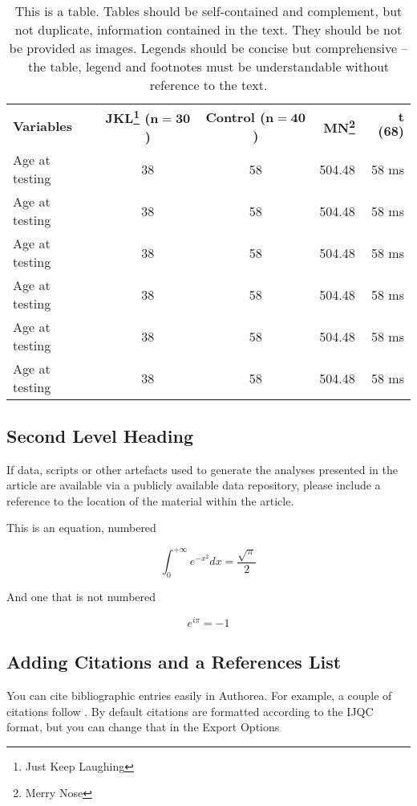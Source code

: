\documentclass[num-refs]{wiley-article}
\begin{document}
\begin{table}
\caption{{This is a table. Tables should be self-contained and complement, but not duplicate, information contained in the text. They should be not be provided as images. Legends should be concise but comprehensive -- the table, legend and footnotes must be understandable without reference to the text.}}
\begin{tabular}{lccrr}
\hline
\textbf{Variables} & \textbf{JKL\footnote{Just Keep Laughing} ($\boldsymbol{n=30}$)} & \textbf{Control ($\boldsymbol{n=40}$)} & \textbf{MN\footnote{Merry Nose}} & \textbf{$\boldsymbol t$ (68)}\\
Age at testing & 38 & 58 & 504.48 & 58 ms\\
Age at testing & 38 & 58 & 504.48 & 58 ms\\
Age at testing & 38 & 58 & 504.48 & 58 ms\\
Age at testing & 38 & 58 & 504.48 & 58 ms\\
Age at testing & 38 & 58 & 504.48 & 58 ms\\
Age at testing & 38 & 58 & 504.48 & 58 ms\\
\hline  
\end{tabular}
\end{table}


\subsection{Second Level Heading}
If data, scripts or other artefacts used to generate the analyses presented in the article are available via a publicly available data repository, please include a reference to the location of the material within the article.

This is an equation, numbered

\begin{equation}
\label{eqn:some}
\int_0^{+\infty}e^{-x^2}dx=\frac{\sqrt{\pi}}{2}
\end{equation}

And one that is not numbered

\begin{equation*}
e^{i\pi}=-1
\end{equation*}

\subsection{Adding Citations and a References List}

You can cite bibliographic entries easily in Authorea. For example, a couple of citations follow \cite{Cavalleri_2016}. By default citations are formatted according to the IJQC format, but you can change that in the Export Options \cite{Meskine_2019}
\end{document}

